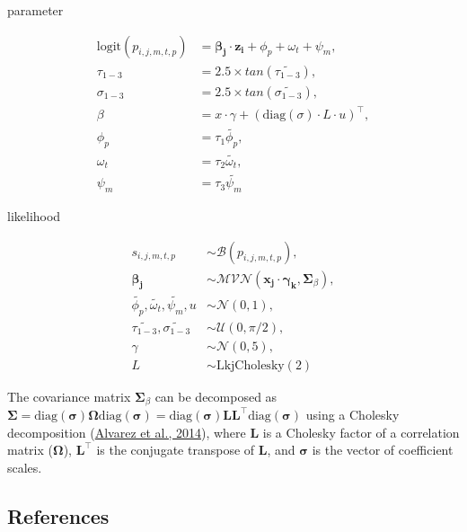 \documentclass[
  12pt,
  a4paper,
,tablecaptionabove
]{scrartcl}
\begin{document}
parameter

\begin{align}
\mathrm{logit}(p_{i,j,m,t,p}) &= \boldsymbol{\beta_{j}} \cdot \boldsymbol{z_{i}} + \phi_p + \omega_t + \psi_m , \nonumber \\
\tau_{1-3} &= 2.5 \times tan(\tilde{\tau_{1-3}}), \nonumber \\
\sigma_{1-3} &= 2.5 \times tan(\tilde{\sigma_{1-3}}), \nonumber \\
\beta &= x \cdot \gamma + (\mathrm{diag}(\sigma)\cdot L \cdot u)^\top, \nonumber \\
\phi_p &= \tau_1 \tilde{\phi_p}, \nonumber \\
\omega_t &= \tau_2 \tilde{\omega_t}, \nonumber \\
\psi_m &= \tau_3 \tilde{\psi_m}
\end{align}

likelihood

\begin{align}
s_{i,j,m,t,p} &\sim \mathcal{B}(p_{i, j, m, t, p}) , \nonumber \\
\boldsymbol{\beta_j} &\sim \mathcal{MVN}(\boldsymbol{x_j} \cdot \boldsymbol{\gamma_k}, {\boldsymbol \Sigma_{\beta}}) , \nonumber \\
\tilde{\phi_p}, \tilde{\omega_t}, \tilde{\psi_m}, u &\sim \mathcal{N}(0, 1), \nonumber \\
\tilde{\tau_{1-3}}, \tilde{\sigma_{1-3}} &\sim \mathcal{U}(0, \pi/2), \nonumber \\
\gamma &\sim \mathcal{N}(0, 5), \nonumber \\
L &\sim \mathrm{LkjCholesky}(2)
\end{align}

The covariance matrix \(\boldsymbol \Sigma_{\beta}\) can be decomposed
as
\({\boldsymbol \Sigma} = \mathrm {diag}({\boldsymbol \sigma}){\boldsymbol \Omega}\mathrm {diag}({\boldsymbol \sigma}) = \mathrm {diag}({\boldsymbol \sigma})\boldsymbol{LL}^\top \mathrm {diag}({\boldsymbol \sigma})\)
using a Cholesky decomposition
(\protect\hyperlink{ref-Alvarez2014}{Alvarez et al., 2014}), where
\(\boldsymbol{L}\) is a Cholesky factor of a correlation matrix
(\(\boldsymbol \Omega\)), \(\boldsymbol{L}^\top\) is the conjugate
transpose of \(\boldsymbol{L}\), and \(\boldsymbol \sigma\) is the
vector of coefficient scales.

\hypertarget{references}{%
\subsection*{References}\label{references}}
\end{document}
